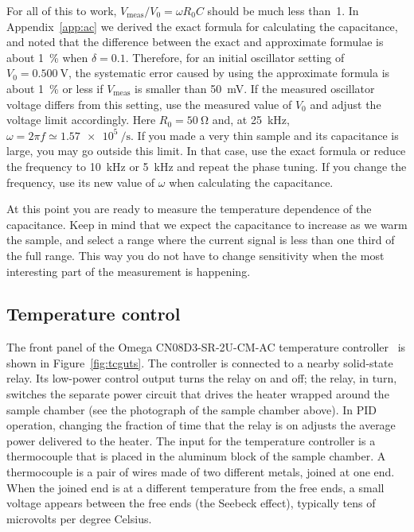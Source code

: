 \documentclass[11pt,a4paper]{article}
\begin{document}
For all of this to work, $V_{\mathrm{meas}}/V_0 = \omega R_0 C$ should be
much less than~1. In Appendix~\ref{app:ac} we derived the exact formula
for calculating the capacitance, and noted that the difference between
the exact and approximate formulae is about \SI{1}{\percent} when
$\delta = 0.1$. Therefore, for an initial oscillator setting of
$V_0 = \SI{0.500}{\volt}$, the systematic error caused by using the
approximate formula is about \SI{1}{\percent} or less if
$V_{\mathrm{meas}}$ is smaller than \SI{50}{\milli\volt}. If the measured
oscillator voltage differs from this setting, use the measured value of
$V_0$ and adjust the voltage limit accordingly. Here
$R_0 = \SI{50}{\ohm}$ and, at \SI{25}{\kilo\hertz},
$\omega = 2\pi f \simeq \SI{1.57e5}{\per\second}$.
If you made a very thin sample and its capacitance is large, you may
go outside this limit. In that case, use the exact formula or reduce
the frequency to \SI{10}{\kilo\hertz} or \SI{5}{\kilo\hertz} and repeat
the phase tuning. If you change the frequency, use its new value of
$\omega$ when calculating the capacitance.

At this point you are ready to measure the temperature dependence of the
capacitance. Keep in mind that we expect the capacitance to increase as we warm
the sample, and select a range where the current signal is less than one third of
the full range. This way you do not have to change sensitivity when the most
interesting part of the measurement is happening.

\subsection{Temperature control}

The front panel of the Omega CN08D3-SR-2U-CM-AC temperature
controller~\cite{ref:pid} is shown in Figure~\ref{fig:tcguts}.
The controller is connected to a nearby solid-state relay. Its
low-power control output turns the relay on and off; the relay, in
turn, switches the separate power circuit that drives the heater
wrapped around the sample chamber (see the photograph of the sample
chamber above). In PID operation, changing the fraction of time that
the relay is on adjusts the average power delivered to the heater.
The input for the temperature controller is a thermocouple
that is placed in the aluminum block of the sample chamber. A
thermocouple is a pair of wires made of two different metals, joined
at one end. When the joined end is at a different temperature from
the free ends, a small voltage appears between the free ends (the
Seebeck effect), typically tens of microvolts per degree Celsius.
\end{document}
